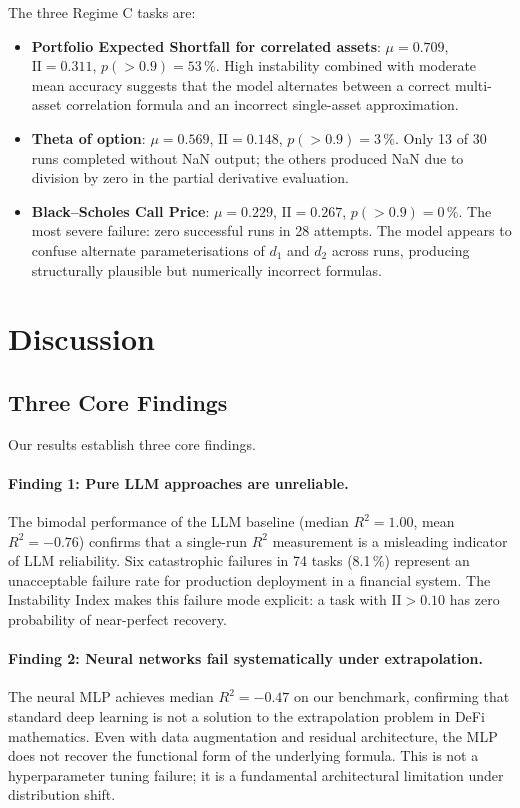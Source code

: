 \documentclass[twoside,11pt]{article}
\newcommand{\Rsq}{R^{2}}
\newcommand{\II}{\mathrm{II}}
\begin{document}
The three Regime C tasks are:
\begin{itemize}
  \item \textbf{Portfolio Expected Shortfall for correlated assets}:
    $\mu=0.709$, $\II=0.311$, $p(>0.9)=53\,\%$.  High instability combined with
    moderate mean accuracy suggests that the model alternates between a correct
    multi-asset correlation formula and an incorrect single-asset approximation.
  \item \textbf{Theta of option}: $\mu=0.569$, $\II=0.148$, $p(>0.9)=3\,\%$.
    Only 13 of 30 runs completed without NaN output; the others produced NaN due
    to division by zero in the partial derivative evaluation.
  \item \textbf{Black--Scholes Call Price}: $\mu=0.229$, $\II=0.267$, $p(>0.9)=0\,\%$.
    The most severe failure: zero successful runs in 28 attempts.  The model
    appears to confuse alternate parameterisations of $d_1$ and $d_2$ across runs,
    producing structurally plausible but numerically incorrect formulas.
\end{itemize}

\section{Discussion}
\label{sec:discussion}

\subsection{Three Core Findings}

Our results establish three core findings.

\paragraph{Finding 1: Pure LLM approaches are unreliable.}
The bimodal performance of the LLM baseline (median $\Rsq=1.00$, mean $\Rsq=-0.76$)
confirms that a single-run $\Rsq$ measurement is a misleading indicator of LLM
reliability.  Six catastrophic failures in 74 tasks (8.1\,\%) represent an
unacceptable failure rate for production deployment in a financial system.  The
Instability Index makes this failure mode explicit: a task with $\II>0.10$ has
zero probability of near-perfect recovery.

\paragraph{Finding 2: Neural networks fail systematically under extrapolation.}
The neural MLP achieves median $\Rsq=-0.47$ on our benchmark, confirming that
standard deep learning is not a solution to the extrapolation problem in DeFi
mathematics.  Even with data augmentation and residual architecture, the MLP does
not recover the functional form of the underlying formula.  This is not a
hyperparameter tuning failure; it is a fundamental architectural limitation under
distribution shift.
\end{document}
